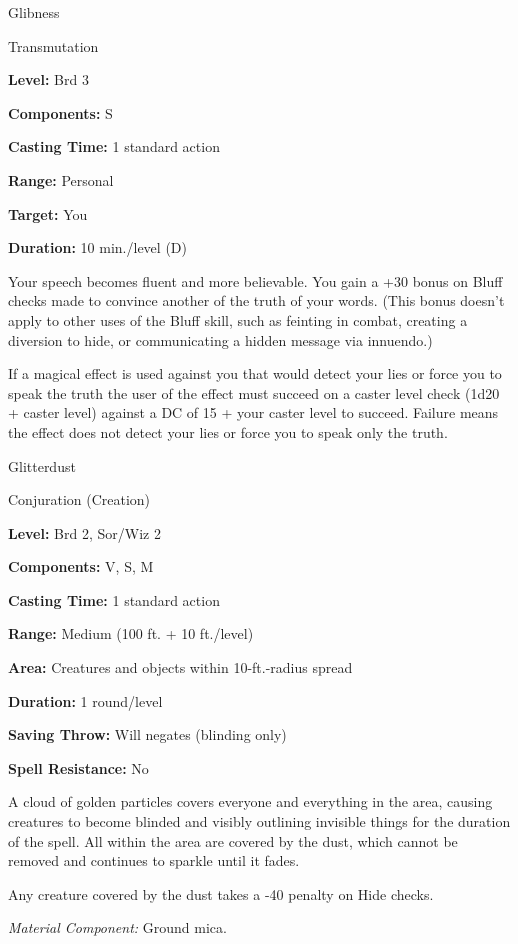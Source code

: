\documentclass{article}
\begin{document}
\vspace{12pt}
Glibness

Transmutation

\textbf{Level:} Brd 3

\textbf{Components:} S

\textbf{Casting Time:} 1 standard action

\textbf{Range:} Personal

\textbf{Target:} You

\textbf{Duration:} 10 min./level (D)

Your speech becomes fluent and more believable. You gain a +30 bonus on Bluff checks 
made to convince another of the truth of your words. (This bonus doesn't apply 
to other uses of the Bluff skill, such as feinting in combat, creating a diversion 
to hide, or communicating a hidden message via innuendo.)

If a magical effect is used against you that would detect your lies or force you 
to speak the truth the user of the effect must succeed on a caster level check 
(1d20 + caster level) against a DC of 15 + your caster level to succeed. Failure 
means the effect does not detect your lies or force you to speak only the truth.

\vspace{12pt}
Glitterdust

Conjuration (Creation)

\textbf{Level:} Brd 2, Sor/Wiz 2

\textbf{Components:} V, S, M

\textbf{Casting Time:} 1 standard action

\textbf{Range: }Medium (100 ft. + 10 ft./level)

\textbf{Area:} Creatures and objects within 10-ft.-radius spread

\textbf{Duration:} 1 round/level

\textbf{Saving Throw: }Will negates (blinding only)

\textbf{Spell Resistance:} No

A cloud of golden particles covers everyone and everything in the area, causing 
creatures to become blinded and visibly outlining invisible things for the duration 
of the spell. All within the area are covered by the dust, which cannot be removed 
and continues to sparkle until it fades.

Any creature covered by the dust takes a -40 penalty on Hide checks.

\textit{Material Component: }Ground mica.
\end{document}
